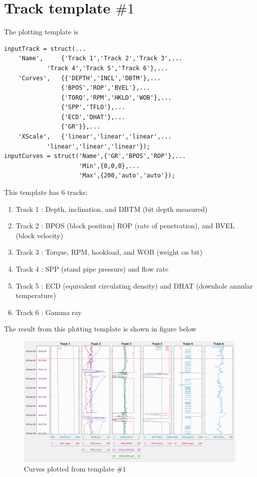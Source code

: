 \documentclass[12pt,a4paper,oneside]{report}
\begin{document}
\section{Track template $\#1$}
The plotting template is
\begin{lstlisting}[style=Matlab-editor]
inputTrack = struct(...
    'Name',     {'Track 1','Track 2','Track 3',...
    		'Track 4','Track 5','Track 6'},...
    'Curves',   {{'DEPTH','INCL','DBTM'},...
                {'BPOS','ROP','BVEL'},...
                {'TORQ','RPM','HKLD','WOB'},...
                {'SPP','TFLO'},...
                {'ECD','DHAT'},...
                {'GR'}},...
    'XScale',   {'linear','linear','linear',...
    		'linear','linear','linear'});
inputCurves = struct('Name',{'GR','BPOS','ROP'},...
                     'Min',{0,0,0},...
                     'Max',{200,'auto','auto'});
\end{lstlisting}

\noindent This template has 6 tracks:
\begin{enumerate}
\setlength\itemsep{0.1em}
\item Track 1 : Depth, inclination, and DBTM (bit depth measured)
\item Track 2 : BPOS (block position) ROP (rate of penetration), and BVEL (block velocity)
\item Track 3 : Torque, RPM, hookload, and WOB (weight on bit)
\item Track 4 : SPP (stand pipe pressure) and flow rate
\item Track 5 : ECD (equivalent circulating density) and DHAT (downhole annular temperature)
\item Track 6 : Gamma ray
\end{enumerate}

\noindent The result from this plotting template is shown in figure below
\begin{figure}[H]
\centering
\includegraphics[width=\textwidth]{example1.PNG}
\caption{Curves plotted from template $\#1$}
\end{figure}
\end{document}
